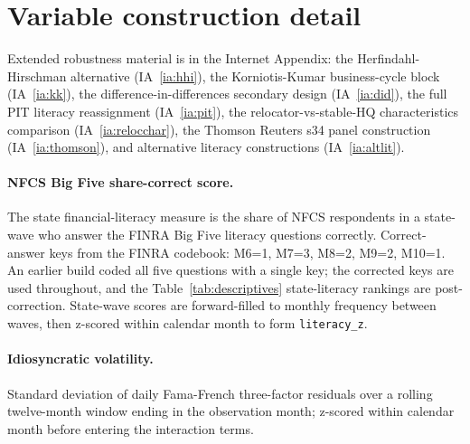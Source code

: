 \appendix
\section{Variable construction detail}
\label{app:variables}

Extended robustness material is in the Internet Appendix: the Herfindahl-Hirschman alternative (IA~\ref{ia:hhi}), the Korniotis-Kumar business-cycle block (IA~\ref{ia:kk}), the difference-in-differences secondary design (IA~\ref{ia:did}), the full PIT literacy reassignment (IA~\ref{ia:pit}), the relocator-vs-stable-HQ characteristics comparison (IA~\ref{ia:relocchar}), the Thomson Reuters s34 panel construction (IA~\ref{ia:thomson}), and alternative literacy constructions (IA~\ref{ia:altlit}).

\paragraph{NFCS Big Five share-correct score.} The state financial-literacy measure is the share of NFCS respondents in a state-wave who answer the FINRA Big Five literacy questions correctly. Correct-answer keys from the FINRA codebook: M6=1, M7=3, M8=2, M9=2, M10=1. An earlier build coded all five questions with a single key; the corrected keys are used throughout, and the Table~\ref{tab:descriptives} state-literacy rankings are post-correction. State-wave scores are forward-filled to monthly frequency between waves, then z-scored within calendar month to form \texttt{literacy\_z}.

\paragraph{Idiosyncratic volatility.} Standard deviation of daily Fama-French three-factor residuals over a rolling twelve-month window ending in the observation month; z-scored within calendar month before entering the interaction terms.
